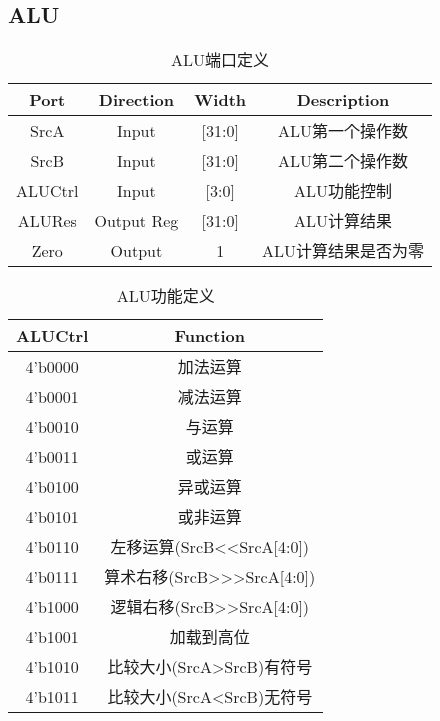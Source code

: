 \documentclass[UTF8]{ctexart}
\begin{document}
\subsection{ALU}
\begin{table}[H]
	\centering
	\begin{threeparttable}
		\caption{ALU端口定义}
		\begin{tabular}{cccc}
			\toprule
			\rowcolor{mypink}
			\textbf{Port} & \textbf{Direction} & \textbf{Width} & \textbf{Description} \\
			\midrule
			SrcA          & Input              & [31:0]         & ALU第一个操作数      \\
			\midrule
			SrcB          & Input              & [31:0]         & ALU第二个操作数      \\
			\midrule
			ALUCtrl       & Input              & [3:0]          & ALU功能控制          \\
			\midrule
			ALURes        & Output Reg         & [31:0]         & ALU计算结果          \\
			\midrule
			Zero          & Output             & 1              & ALU计算结果是否为零  \\
			\midrule
		\end{tabular}
	\end{threeparttable}
\end{table}
\begin{table}[H]
	\centering
	\begin{threeparttable}
		\caption{ALU功能定义}
		\begin{tabular}{cc}
			\toprule
			\rowcolor{mypink}
			\textbf{ALUCtrl} & \textbf{Function}          \\
			\midrule
			4'b0000          & 加法运算                   \\
			\midrule
			4'b0001          & 减法运算                   \\
			\midrule
			4'b0010          & 与运算                     \\
			\midrule
			4'b0011          & 或运算                     \\
			\midrule
			4'b0100          & 异或运算                   \\
			\midrule
			4'b0101          & 或非运算                   \\
			\midrule
			4'b0110          & 左移运算(SrcB<<SrcA[4:0])  \\
			\midrule
			4'b0111          & 算术右移(SrcB>>>SrcA[4:0]) \\
			\midrule
			4'b1000          & 逻辑右移(SrcB>>SrcA[4:0])  \\
			\midrule
			4'b1001          & 加载到高位                 \\
			\midrule
			4'b1010          & 比较大小(SrcA>SrcB)有符号  \\
			\midrule
			4'b1011          & 比较大小(SrcA<SrcB)无符号  \\
			\midrule
		\end{tabular}
	\end{threeparttable}
\end{table}
\newpage
\end{document}
